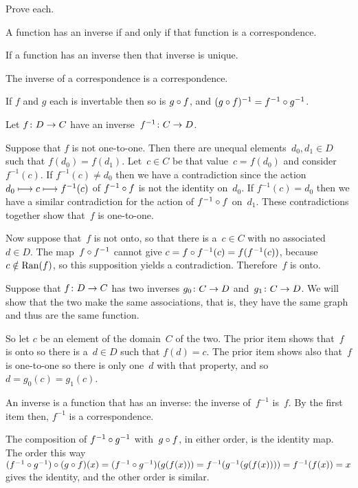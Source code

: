 \documentclass{ibl}
\begin{document}
\begin{ex} Prove each.
\begin{exes}
\item A function has an inverse if and only if that 
  function is a correspondence.
\item If a function has an inverse then that inverse
  is unique.
\item The inverse of a correspondence is a correspondence.  
\item If $f$ and $g$ each is invertable then so is 
  $g\mathbin{\circ} f$, and $(g\mathbin{\circ} f)^{-1}=f^{-1}\mathbin{\circ} g^{-1}$.
\end{exes}
\begin{ans}
\begin{exes}
\item Let $\mbox{$f\colon D\to C$}$ have an inverse~$\mbox{$f^{-1}\colon C\to D$}$.

  Suppose that $f$ is not one-to-one.
  Then there are unequal elements~$d_0,d_1\in D$
  such that $f(d_0)=f(d_1)$.
  Let~$c\in C$ be that value~$c=f(d_0)$ and consider~$f^{-1}(c)$.
  If $f^{-1}(c)\neq d_0$ then we have a contradiction since the 
  action $d_0\stackrel{}{\longmapsto}c\stackrel{}{\longmapsto}f^{-1}(c)$
  of $f^{-1}\mathbin{\circ} f$ is not the identity on~$d_0$.
  If $f^{-1}(c)=d_0$ then we have a similar contradiction for the
  action of $f^{-1}\mathbin{\circ} f$ on~$d_1$.
  These contradictions together show that~$f$ is one-to-one.
   
  Now suppose that~$f$ is not onto,
  so that there is a~$c\in C$ with no associated~$d\in D$.
  The map~$f\mathbin{\circ} f^{-1}$
  cannot give $c=f\mathbin{\circ} f^{-1}(c)=f(f^{-1}(c))$, 
  because $c\notin\operatorname{Ran}(f)$, so this supposition yields a contradiction.
  Therefore~$f$ is onto.
\item Suppose that $\mbox{$f\colon D\to C$}$ has two inverses $\mbox{$g_0\colon C\to D$}$
  and~$\mbox{$g_1\colon C\to D$}$.
  We will show that the two make the same associations, that is, they 
  have the same graph and
  thus are the same function.

  So let $c$ be an element of the domain~$C$ of the two.
  The prior item shows that~$f$ is onto so there is a~$d\in D$ such that
  $f(d)=c$.
  The prior item shows also that~$f$ is one-to-one so there is only 
  one~$d$ with that property, and so $d=g_0(c)=g_1(c)$.
\item An inverse is a function that has an inverse: the inverse of~$f^{-1}$
  is~$f$.
  By the first item then, $f^{-1}$ is a correspondence.
\item The composition of $f^{-1}\mathbin{\circ} g^{-1}$ with~$g\mathbin{\circ} f$,
  in either order, is the identity map.
  The order this way  
  $(f^{-1}\mathbin{\circ} g^{-1})\mathbin{\circ} (g\mathbin{\circ} f)(x)
  =(f^{-1}\mathbin{\circ} g^{-1})(g(f(x)))
  =f^{-1}(g^{-1}(g(f(x))))
  =f^{-1}(f(x))=x$
  gives the identity,
  and the other order is similar.
\end{exes}
\end{ans}
\end{ex}
\end{document}
